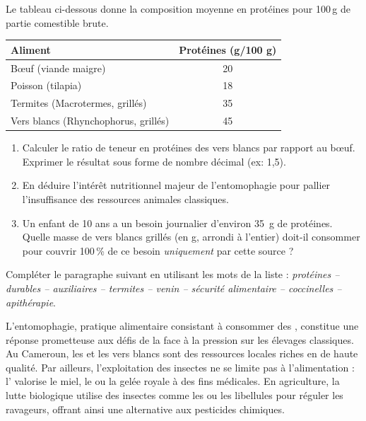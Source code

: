 \documentclass[11pt]{article}
\begin{document}
\begin{exercice}
Le tableau ci-dessous donne la composition moyenne en protéines pour 100\,g de partie comestible brute.

\begin{tabular}{|l|c|}
\hline
\textbf{Aliment} & \textbf{Protéines (g/100 g)} \\
\hline
Bœuf (viande maigre) & 20 \\
\hline
Poisson (tilapia) & 18 \\
\hline
Termites (Macrotermes, grillés) & 35 \\
\hline
Vers blancs (Rhynchophorus, grillés) & 45 \\
\hline
\end{tabular}

\begin{enumerate}[label=\arabic*.]
\item Calculer le ratio de teneur en protéines des vers blancs par rapport au bœuf. Exprimer le résultat sous forme de nombre décimal (ex: 1,5).
\item En déduire l'intérêt nutritionnel majeur de l'entomophagie pour pallier l'insuffisance des ressources animales classiques.
\item Un enfant de 10 ans a un besoin journalier d'environ \SI{35}{g} de protéines. Quelle masse de vers blancs grillés (en g, arrondi à l'entier) doit-il consommer pour couvrir 100\,\% de ce besoin \textit{uniquement} par cette source ?
\end{enumerate}
\end{exercice}

\begin{exercice}
Compléter le paragraphe suivant en utilisant les mots de la liste : \textit{protéines -- durables -- auxiliaires -- termites -- venin -- sécurité alimentaire -- coccinelles -- apithérapie}.

L'entomophagie, pratique alimentaire consistant à consommer des \underline{\hspace{3cm}}, constitue une réponse prometteuse aux défis de la \underline{\hspace{3cm}} face à la pression sur les élevages classiques. Au Cameroun, les \underline{\hspace{3cm}} et les vers blancs sont des ressources locales riches en \underline{\hspace{3cm}} de haute qualité. Par ailleurs, l'exploitation des insectes ne se limite pas à l'alimentation : l'\underline{\hspace{3cm}} valorise le miel, le \underline{\hspace{3cm}} ou la gelée royale à des fins médicales. En agriculture, la lutte biologique utilise des insectes \underline{\hspace{3cm}} comme les \underline{\hspace{3cm}} ou les libellules pour réguler les ravageurs, offrant ainsi une alternative \underline{\hspace{3cm}} aux pesticides chimiques.
\end{exercice}
\end{document}
